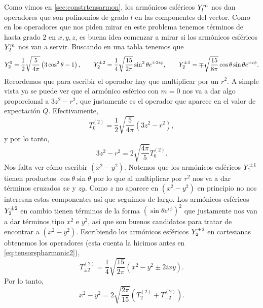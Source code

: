 \documentclass[10pt, a4paper]{article}
\numberwithin{equation}{subsection}
\begin{document}
Como vimos en \ref{sec:constrtensarmon}, los armónicos esféricos
$\SphericalHarmonic{l}{m}$ nos dan operadores que son polinomios de grado $l$
en las componentes del vector. Como en los operadores que nos piden mirar en
este problema tenemos términos de hasta grado $2$ en $x,y,z$, es buena idea
comenzar a mirar si los armónicos esféricos $\SphericalHarmonic{2}{m}$ nos van
a servir. Buscando en una tabla tenemos que
\begin{equation}
  \SphericalHarmonic{2}{0} = \frac{1}{2}\sqrt{\frac{5}{4\pi}}
    \left(3\cos^2\theta - 1\right), \qquad
  \SphericalHarmonic{2}{\pm2} = \frac{1}{4}\sqrt{\frac{15}{2\pi}}\sin^2\theta
    e^{\pm2i\phi}, \qquad
  \SphericalHarmonic{2}{\pm1} = \mp\sqrt{\frac{15}{8\pi}}\cos\theta\sin\theta
    e^{\pm i\phi}.
\end{equation}
Recordemos que para escribir el operador hay que multiplicar por un $r^2$.
A simple vista ya se puede ver que el armónico esférico con $m = 0$ nos va a
dar algo proporcional a $3z^2 - r^2$, que justamente es el operador que aparece
en el valor de expectación $Q$. Efectivamente,
\begin{equation}
  T^{(2)}_0 = \frac{1}{2}\sqrt{\frac{5}{4\pi}}\left(3z^2 - r^2\right),
\end{equation}
y por lo tanto,
\begin{equation}
  3z^2 - r^2  = 2\sqrt{\frac{4\pi}{5}} T^{(2)}_0.
\end{equation}
Nos falta ver cómo escribir $(x^2 - y^2)$. Notemos que los armónicos esféricos
$\SphericalHarmonic{1}{\pm1}$ tienen productos $\cos\theta\sin\theta$ por lo
que al multiplicar por $r^2$ nos va a dar términos cruzados $zx$ y $zy$. Como
$z$ no aparece en $(x^2 - y^2)$ en principio no nos interesan estas componentes
así que seguimos de largo. Los armónicos esféricos
$\SphericalHarmonic{2}{\pm2}$ en cambio tienen términos de la forma
$\left(\sin\theta e^{i\phi}\right)^2$ que justamente nos van a dar términos
tipo $x^2$ e $y^2$, así que son buenos candidatos para tratar de encontrar a
$(x^2 - y^2)$. Escribiendo los armónicos esféricos
$\SphericalHarmonic{2}{\pm2}$ en cartesianas obtenemos los operadores (esta
cuenta la hicimos antes en \eqref{eq:tensorspharmonic2}),
\begin{equation} \label{eq:T22spherharm}
  T^{(2)}_{\pm2} = \frac{1}{4}\sqrt{\frac{15}{2\pi}}\left(x^2 - y^2
    \pm2ixy\right).
\end{equation}
Por lo tanto,
\begin{equation}
  x^2 - y^2 = 2\sqrt{\frac{2\pi}{15}}\left(T^{(2)}_{2} + T^{(2)}_{-2}\right).
\end{equation}
\end{document}
